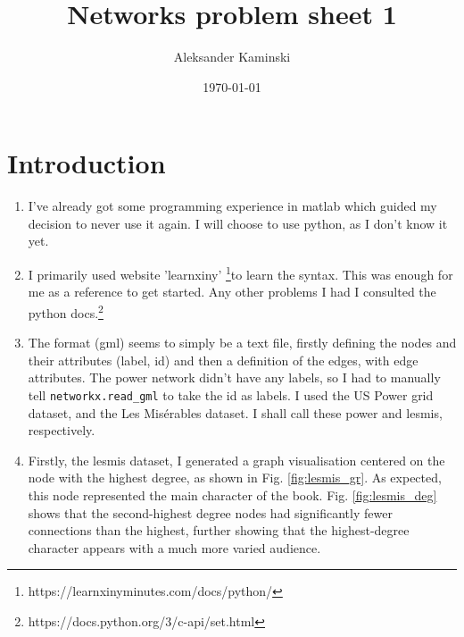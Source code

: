 \documentclass[a4paper]{article}
\title{Networks problem sheet 1}
\author{Aleksander Kaminski}
\date{\today}
\begin{document}
\maketitle


\section{Introduction}


\begin{enumerate}[label={(1.\alph*):}]
    \item
        I've already got some programming experience in matlab which guided my decision to never use it again. I will choose to use python, as I don't know it yet.
    \item
        I primarily used website 'learnxiny' \footnote{https://learnxinyminutes.com/docs/python/}to learn the syntax. This was enough for me as a reference to get started. Any other problems I had I consulted the python docs.\footnote{https://docs.python.org/3/c-api/set.html}  
        \setcounter{enumi}{3}
    \item
        The format (gml) seems to simply be a text file, firstly defining the nodes and their attributes (label, id) and then a definition of the edges, with edge attributes. The power network didn't have any labels, so I had to manually tell \lstinline{networkx.read_gml} to take the id as labels. I used the US Power grid dataset\cite{power}, and the Les Misérables\cite{lesmis} dataset. I shall call these power and lesmis, respectively.
    \item
        Firstly, the lesmis dataset, I generated a graph visualisation centered on the node with the highest degree, as shown in Fig. \ref{fig:lesmis_gr}. As expected, this node represented the main character of the book. Fig. \ref{fig:lesmis_deg} shows that the second-highest degree nodes had significantly fewer connections than the highest, further showing that the highest-degree character appears with a much more varied audience. \\
 

\end{enumerate}
\end{document}
